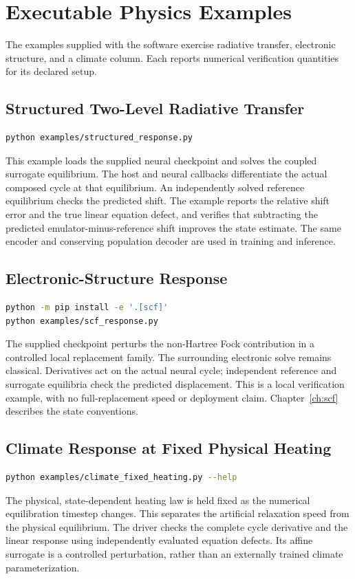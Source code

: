 
\chapter{Executable Physics Examples}
\label{ch:recipes}

The examples supplied with the software exercise radiative transfer,
electronic structure, and a climate column. Each reports numerical
verification quantities for its declared setup.

\section{Structured Two-Level Radiative Transfer}
\begin{lstlisting}[language=bash]
python examples/structured_response.py
\end{lstlisting}
This example loads the supplied neural checkpoint and solves the coupled
surrogate equilibrium. The host and neural callbacks differentiate the
actual composed cycle at that equilibrium. An independently solved
reference equilibrium checks the predicted shift. The example reports
the relative shift error and the true linear equation defect, and verifies
that subtracting the predicted emulator-minus-reference shift improves
the state estimate. The same encoder and conserving population decoder
are used in training and inference.

\section{Electronic-Structure Response}
\begin{lstlisting}[language=bash]
python -m pip install -e '.[scf]'
python examples/scf_response.py
\end{lstlisting}
The supplied checkpoint perturbs the non-Hartree Fock contribution in a
controlled local replacement family. The surrounding electronic solve
remains classical. Derivatives act on the actual neural cycle; independent
reference and surrogate equilibria check the predicted displacement.
This is a local verification example, with no full-replacement speed or
deployment claim. Chapter~\ref{ch:scf} describes the state conventions.

\section{Climate Response at Fixed Physical Heating}
\begin{lstlisting}[language=bash]
python examples/climate_fixed_heating.py --help
\end{lstlisting}
The physical, state-dependent heating law is held fixed as the numerical
equilibration timestep changes. This separates the artificial relaxation
speed from the physical equilibrium. The driver checks the complete
cycle derivative and the linear response using independently evaluated
equation defects. Its affine surrogate is a controlled perturbation,
rather than an externally trained climate parameterization.

